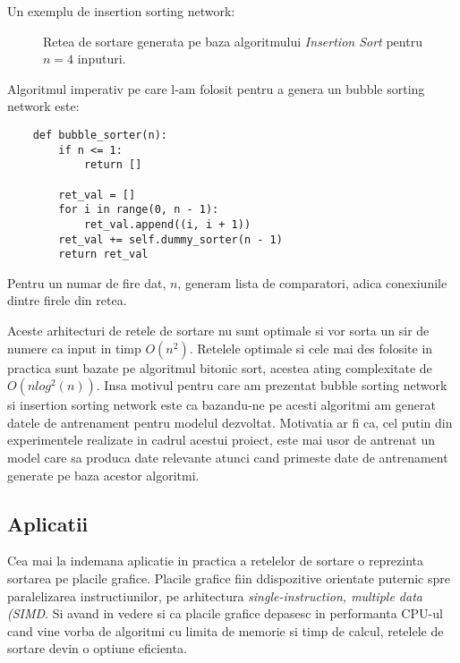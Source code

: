 \documentclass[12pt]{article}
\begin{document}
Un exemplu de insertion sorting network:

\begin{figure}
\centering
{}
\caption{Retea de sortare generata pe baza algoritmului \textit{Insertion Sort} pentru $n=4$ inputuri.}
\end{figure}

Algoritmul imperativ pe care l-am folosit pentru a genera un bubble sorting network este:
\begin{lstlisting}
    def bubble_sorter(n):
        if n <= 1:
            return []

        ret_val = []
        for i in range(0, n - 1):
            ret_val.append((i, i + 1))
        ret_val += self.dummy_sorter(n - 1)
        return ret_val
\end{lstlisting}
Pentru un numar de fire dat, $n$, generam lista de comparatori, adica conexiunile dintre firele din retea.

    Aceste arhitecturi de retele de sortare nu sunt optimale si vor sorta un sir de numere ca input in timp
$O(n^2)$. Retelele optimale si cele mai des folosite in practica sunt bazate pe algoritmul bitonic sort, acestea ating complexitate de $O(nlog^2(n))$. Insa motivul pentru care am prezentat bubble sorting network si insertion sorting network este
ca bazandu-ne pe acesti algoritmi am generat datele de antrenament pentru modelul dezvoltat. Motivatia ar fi ca, cel putin din experimentele realizate in cadrul acestui proiect, este mai usor de antrenat un model care sa produca date relevante atunci cand primeste date de antrenament generate pe baza acestor algoritmi.

\subsection{Aplicatii}
Cea mai la indemana aplicatie in practica a retelelor de sortare o reprezinta sortarea pe placile grafice. Placile grafice fiin ddispozitive orientate puternic spre paralelizarea instructiunilor, pe arhitectura \textit{single-instruction, multiple data (SIMD}. Si avand in vedere si ca placile grafice depasesc in performanta CPU-ul cand vine vorba de algoritmi cu limita de memorie si timp de calcul, retelele de sortare devin o optiune eficienta.
\end{document}
